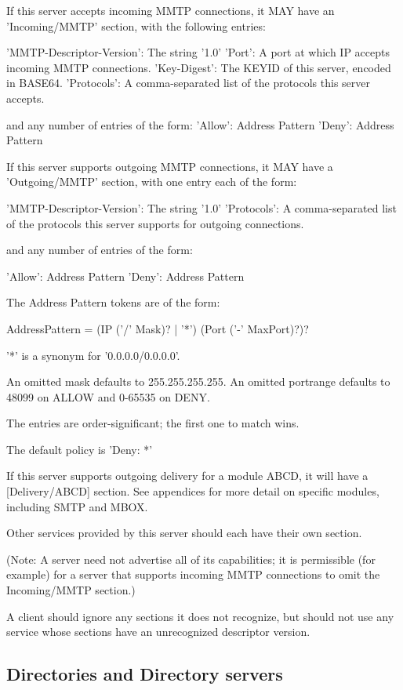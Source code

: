 If this server accepts incoming MMTP connections, it MAY have an
'Incoming/MMTP' section, with the following entries:

     'MMTP-Descriptor-Version': The string '1.0'
     'Port': A port at which IP accepts incoming MMTP connections.
     'Key-Digest': The KEYID of this server, encoded in BASE64.
     'Protocols': A comma-separated list of the protocols this
           server accepts.

and any number of entries of the form:
     'Allow': Address Pattern
     'Deny': Address Pattern

If this server supports outgoing MMTP connections, it MAY have a
'Outgoing/MMTP' section, with one entry each of the form:

      'MMTP-Descriptor-Version': The string '1.0'
      'Protocols': A comma-separated list of the protocols this server
           supports for outgoing connections.

and any number of entries of the form:

      'Allow': Address Pattern
      'Deny': Address Pattern

The Address Pattern tokens are of the form:

   AddressPattern = (IP ('/' Mask)? | '*') (Port ('-' MaxPort)?)?

'*' is a synonym for '0.0.0.0/0.0.0.0'.

An omitted mask defaults to 255.255.255.255.  An omitted portrange
defaults to 48099 on ALLOW and 0-65535 on DENY.

The entries are order-significant; the first one to match wins.

The default policy is 'Deny: *'

If this server supports outgoing delivery for a module ABCD, it will
have a [Delivery/ABCD] section.  See appendices for more detail on
specific modules, including SMTP and MBOX.

Other services provided by this server should each have their own section.

(Note: A server need not advertise all of its capabilities; it is
permissible (for example) for a server that supports incoming MMTP
connections to omit the Incoming/MMTP section.)

A client should ignore any sections it does not recognize, but should
not use any service whose sections have an unrecognized descriptor
version.

\subsection{Directories and Directory servers}

